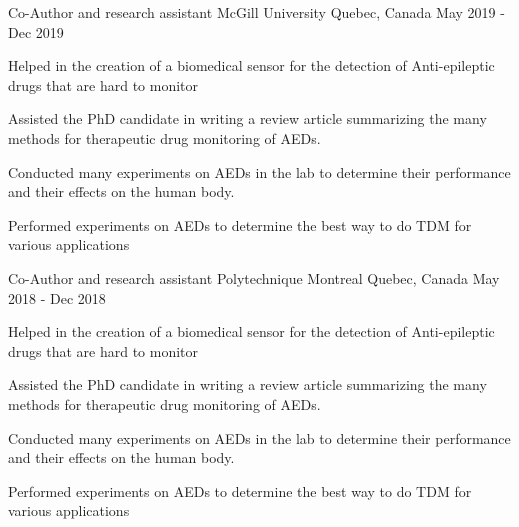 \begin{cventries}
  \cventry
    {Co-Author and research assistant}
    {McGill University}
    {Quebec, Canada}
    {May 2019 - Dec 2019}
    {
      \begin{cvitems}
        \item {Helped in the creation of a biomedical sensor for the detection of Anti-epileptic drugs that are hard to monitor}
        \item {Assisted the PhD candidate in writing a review article summarizing the many methods for therapeutic drug monitoring of AEDs.}
        \item {Conducted many experiments on AEDs in the lab to determine their performance and their effects on the human body.}
        \item {Performed experiments on AEDs to determine the best way to do TDM for various applications}
      \end{cvitems}
    }
\end{cventries}
\begin{cventries}
  \cventry
    {Co-Author and research assistant}
    {Polytechnique Montreal}
    {Quebec, Canada}
    {May 2018 - Dec 2018}
    {
      \begin{cvitems}
        \item {Helped in the creation of a biomedical sensor for the detection of Anti-epileptic drugs that are hard to monitor}
        \item {Assisted the PhD candidate in writing a review article summarizing the many methods for therapeutic drug monitoring of AEDs.}
        \item {Conducted many experiments on AEDs in the lab to determine their performance and their effects on the human body.}
        \item {Performed experiments on AEDs to determine the best way to do TDM for various applications}
      \end{cvitems}
    }
\end{cventries}